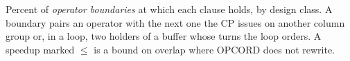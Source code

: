 \begin{table}[t]
    \centering
    \caption{Percent of \emph{operator boundaries} at which each clause holds, by design class. A boundary pairs an operator with the next one the CP issues on another column group or, in a loop, two holders of a buffer whose turns the loop orders. A speedup marked $\le$ is a bound on overlap where OPCORD does not rewrite.}
    \label{tab:census}

\end{table}
